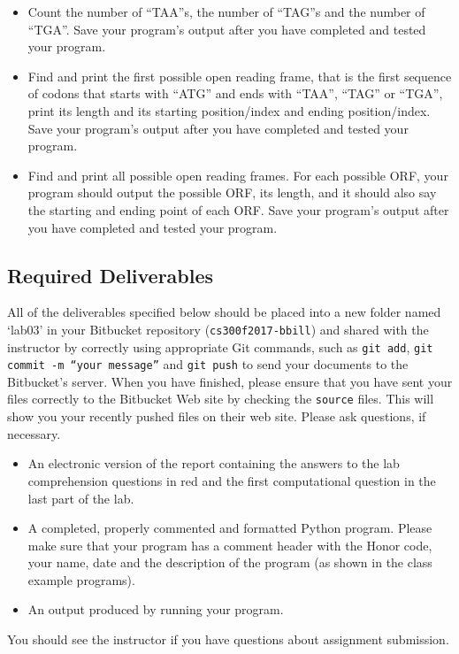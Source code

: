 \begin{itemize}
	\item Count the number of ``TAA''s, the number of ``TAG''s and the number of ``TGA''. Save your program's output after you have completed and tested your program.
	\item Find and print the first possible open reading frame, that is the first sequence of codons that starts with ``ATG'' and ends with ``TAA'', ``TAG'' or ``TGA'', print its length and its starting position/index and ending position/index. Save your program's output after you have completed and tested your program.
	\item Find and print all possible open reading frames. For each possible ORF, your program should output the possible ORF, its length, and it should also say the starting and ending point of each ORF. Save your program's output after you have completed and tested your program.
\end{itemize}


\vspace*{-.2in}
\subsection*{Required Deliverables}
\vspace*{-.1in}
All of the deliverables specified below should be placed into a new folder named `lab03' in your Bitbucket repository ({\tt cs300f2017-bbill})  and shared with the instructor by correctly using  appropriate Git commands, such as {\tt git add}, {\tt git commit -m ``your message''} and {\tt git push} to send your documents to the Bitbucket's server. When you have finished, please ensure that you have sent your files correctly to the Bitbucket Web site by checking the {\tt source} files. This will show you your recently pushed files on their web site. Please ask questions, if necessary.
\color{red}

\begin{itemize}
	\item An electronic version of the report containing the answers to the lab comprehension questions in red and the first computational question in the last part of the lab.
	\item A completed, properly commented and formatted Python program. Please make sure that your program has a comment header with the Honor code, your name, date and the description of the program (as shown in the class example programs).
	\item An output produced by running your program.
\end{itemize}
\color{black}

\noindent You should see the instructor if you have questions about assignment submission.

